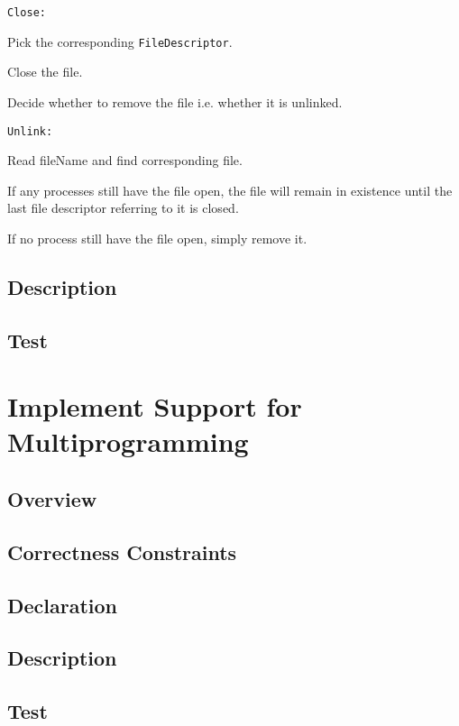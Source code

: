 \documentclass{article}
\begin{document}
\begin{compactitem}
\begin{compactitem}
	\end{compactitem}
\item \texttt{Close:}
	\begin{compactitem}
		\item Pick the corresponding \texttt{FileDescriptor}.
		\item Close the file.
		\item Decide whether to remove the file i.e. whether it is unlinked.
	\end{compactitem}
\item \texttt{Unlink:}
	\begin{compactitem}
		\item Read fileName and find corresponding file.
		\item If any processes still have the file open, the file will remain in existence until the last file descriptor referring to it is closed. 
		\item If no process still have the file open, simply remove it.
	\end{compactitem}
\end{compactitem}
\subsection{Description}
\subsection{Test}

\section{Implement Support for Multiprogramming}
\subsection{Overview}
\subsection{Correctness Constraints}
\subsection{Declaration}
\subsection{Description}
\subsection{Test}
\end{document}
